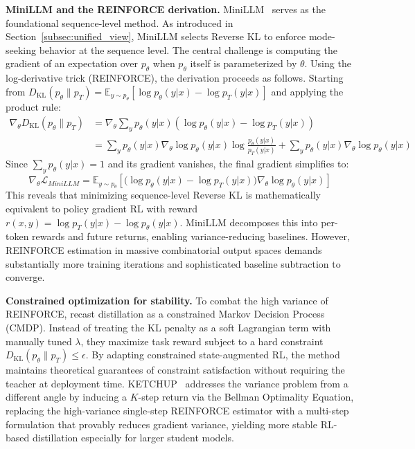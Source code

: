 \documentclass{article} %
\newcommand{\KL}{D_{\mathrm{KL}}}
\newcommand{\ptheta}{p_\theta}
\newcommand{\pteacher}{p_T}
\begin{document}
\textbf{MiniLLM and the REINFORCE derivation.}
MiniLLM~\citep{2306.08543} serves as the foundational sequence-level method. As introduced in Section~\ref{subsec:unified_view}, MiniLLM selects Reverse KL to enforce mode-seeking behavior at the sequence level. The central challenge is computing the gradient of an expectation over $\ptheta$ when $\ptheta$ itself is parameterized by $\theta$. Using the log-derivative trick (REINFORCE), the derivation proceeds as follows. Starting from $\KL(\ptheta \parallel \pteacher) = \mathbb{E}_{y \sim \ptheta} [ \log \ptheta(y|x) - \log \pteacher(y|x) ]$ and applying the product rule:
{\small\begin{align}
    \nabla_\theta \KL(\ptheta \| \pteacher) &= \nabla_\theta \sum_y \ptheta(y|x) \left( \log \ptheta(y|x) - \log \pteacher(y|x) \right) \nonumber \\
    &= \sum_y \ptheta(y|x) \nabla_\theta \log \ptheta(y|x) \log \frac{\ptheta(y|x)}{\pteacher(y|x)} + \sum_y \ptheta(y|x) \nabla_\theta \log \ptheta(y|x)
\end{align}}
Since $\sum_y \ptheta(y|x) = 1$ and its gradient vanishes, the final gradient simplifies to:
\begin{equation}
    \nabla_\theta \mathcal{L}_{MiniLLM} = \mathbb{E}_{y \sim \ptheta} \left[ \Big( \log \ptheta(y|x) - \log \pteacher(y|x) \Big) \nabla_\theta \log \ptheta(y|x) \right]
    \label{eq:minillm_final}
\end{equation}
This reveals that minimizing sequence-level Reverse KL is mathematically equivalent to policy gradient RL with reward $r(x,y) = \log \pteacher(y|x) - \log \ptheta(y|x)$. MiniLLM decomposes this into per-token rewards and future returns, enabling variance-reducing baselines. However, REINFORCE estimation in massive combinatorial output spaces demands substantially more training iterations and sophisticated baseline subtraction to converge.

\textbf{Constrained optimization for stability.}
To combat the high variance of REINFORCE, \citet{2509.22921} recast distillation as a constrained Markov Decision Process (CMDP). Instead of treating the KL penalty as a soft Lagrangian term with manually tuned $\lambda$, they maximize task reward subject to a hard constraint $\KL(\ptheta \parallel \pteacher) \le \epsilon$. By adapting constrained state-augmented RL, the method maintains theoretical guarantees of constraint satisfaction without requiring the teacher at deployment time. KETCHUP~\citep{2504.19024} addresses the variance problem from a different angle by inducing a $K$-step return via the Bellman Optimality Equation, replacing the high-variance single-step REINFORCE estimator with a multi-step formulation that provably reduces gradient variance, yielding more stable RL-based distillation especially for larger student models.
\end{document}
